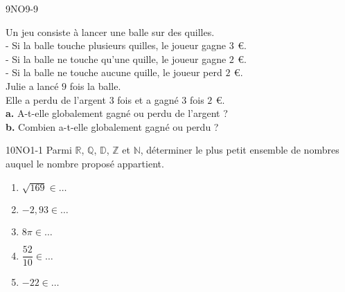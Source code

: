 \documentclass[a4paper,12pt]{report}
\begin{document}
\begin{EXO}{}{9NO9-9}


 
Un jeu consiste à lancer une balle sur des quilles.\\
- Si la balle touche plusieurs quilles, le joueur gagne  $3~$\,\euro{}.\\
- Si la balle ne touche qu'une quille, le joueur gagne  $2~$\,\euro{}.\\
- Si la balle ne touche aucune quille, le joueur perd  $2~$\,\euro{}.\\
Julie a lancé $9$ fois la balle.\\
Elle a perdu de l'argent $3$ fois et a gagné $3$ fois $2~$\,\euro{}.\\ 
\textbf {a.}  A-t-elle globalement gagné ou perdu de l'argent ?\\ 
\textbf {b.}  Combien a-t-elle globalement gagné ou perdu ?

\end{EXO}

\begin{EXO}{}{10NO1-1}
Parmi $\mathbb{R}$, $\mathbb{Q}$, $\mathbb{D}$, $\mathbb{Z}$ et $\mathbb{N}$, déterminer le plus petit ensemble de nombres auquel le nombre proposé appartient.
\begin{multicols}{2}
\begin{enumerate}[]
	\item \begin{minipage}[t]{\linewidth} $\sqrt{169}\in $$\dots$ \end{minipage}
	\item \begin{minipage}[t]{\linewidth} $-2{,}93\in $$\dots$ \end{minipage}
	\item \begin{minipage}[t]{\linewidth} $8\pi \in $$\dots$ \end{minipage}
	\item \begin{minipage}[t]{\linewidth} $\dfrac{52}{10}\in $$\dots$ \end{minipage}
	\item \begin{minipage}[t]{\linewidth} $-22 \in $$\dots$ \end{minipage}
\end{enumerate}
\end{multicols}
\end{EXO}
\end{document}
